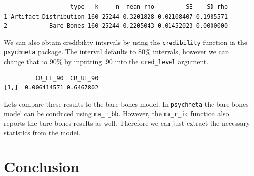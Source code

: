 \documentclass[
  letterpaper,
  DIV=11,
  numbers=noendperiod]{scrreprt}
\newenvironment{Shaded}{}{}
\newcommand{\AttributeTok}[1]{\textcolor[rgb]{0.00,0.34,0.68}{#1}}
\newcommand{\DecValTok}[1]{\textcolor[rgb]{0.69,0.50,0.00}{#1}}
\newcommand{\FunctionTok}[1]{\textcolor[rgb]{0.39,0.29,0.61}{#1}}
\newcommand{\NormalTok}[1]{\textcolor[rgb]{0.12,0.11,0.11}{#1}}
\newcommand{\SpecialCharTok}[1]{\textcolor[rgb]{0.24,0.68,0.91}{#1}}
\newcommand{\StringTok}[1]{\textcolor[rgb]{0.75,0.01,0.01}{#1}}
\begin{document}
\begin{Shaded}
\end{Shaded}

\begin{verbatim}
                   type   k     n  mean_rho         SE    SD_rho
1 Artifact Distribution 160 25244 0.3201828 0.02108407 0.1985571
2            Bare-Bones 160 25244 0.2205043 0.01452023 0.0000000
\end{verbatim}

We can also obtain credibility intervals by using the
\texttt{credibility} function in the \texttt{psychmeta} package. The
interval defaults to 80\% intervals, however we can change that to 90\%
by inputting .90 into the \texttt{cred\_level} argument.

\begin{Shaded}
\end{Shaded}

\begin{verbatim}
         CR_LL_90  CR_UL_90
[1,] -0.006414571 0.6467802
\end{verbatim}

Lets compare these results to the bare-bones model. In
\texttt{psychmeta} the bare-bones model can be conduced using
\texttt{ma\_r\_bb}. However, the \texttt{ma\_r\_ic} function also
reports the bare-bones results as well. Therefore we can just extract
the necessary statistics from the model.


\chapter{Conclusion}\label{conclusion}
\end{document}

